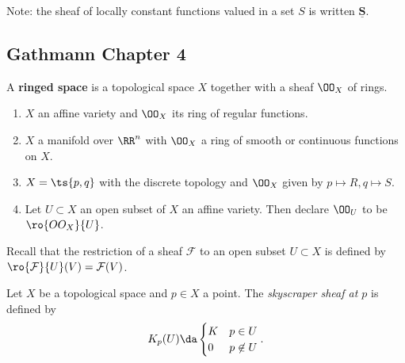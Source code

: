 Note: the sheaf of locally constant functions valued in a set \(S\) is
written \(\underline{\mathbf S}\).

\hypertarget{gathmann-chapter-4}{%
\subsection{Gathmann Chapter 4}\label{gathmann-chapter-4}}

\begin{definition}

A \textbf{ringed space} is a topological space \(X\) together with a
sheaf \(\OO_X\) of rings.

\end{definition}

\begin{example}

\hfill

\begin{enumerate}
\def\labelenumi{\arabic{enumi}.}
\item
  \(X\) an affine variety and \(\OO_X\) its ring of regular functions.
\item
  \(X\) a manifold over \(\RR^n\) with \(\OO_X\) a ring of smooth or
  continuous functions on \(X\).
\item
  \(X = \ts{p, q}\) with the discrete topology and \(\OO_X\) given by
  \(p\mapsto R, q\mapsto S\).
\item
  Let \(U\subset X\) an open subset of \(X\) an affine variety. Then
  declare \(\OO_U\) to be \(\ro{OO_X}{U}\).
\end{enumerate}

\end{example}

Recall that the restriction of a sheaf \(\mathcal{F}\) to an open subset
\(U\subset X\) is defined by
\(\ro{\mathcal{F}}{U}(V) = \mathcal{F}(V)\).

\begin{example}

Let \(X\) be a topological space and \(p\in X\) a point. The
\emph{skyscraper sheaf at \(p\)} is defined by
\begin{align*}  
K_p(U) \da 
\begin{cases}
K & p\in U \\
0 & p\not\in U
\end{cases}
.\end{align*}

\end{example}

